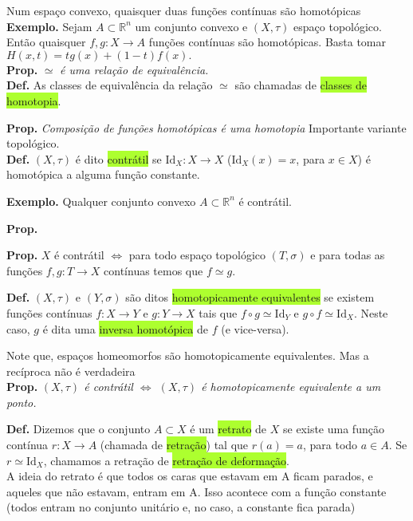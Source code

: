 \documentclass{article}
\begin{document}
\begin{landscape}
\begin{multicols}{3}
\color{blue!70} Num espaço convexo, quaisquer duas funções contínuas são homotópicas\color{black}\\
\textbf{Exemplo.} Sejam \( A \subset \mathbb{R}^n \) um conjunto convexo e \( (X, \tau) \) espaço topológico. Então quaisquer \( f, g : X \to A \) funções contínuas são homotópicas. Basta tomar 
$H(x,t) = t g(x) + (1 - t) f(x).$\\

\textbf{Prop.} \( \simeq \) \textit{é uma relação de equivalência.}\\

\textbf{Def.} As classes de equivalência da relação \( \simeq \) são chamadas de \colorbox{GreenYellow}{classes de homotopia}.

\textbf{Prop.} \textit{Composição de funções homotópicas é uma homotopia}\medskip
\color{blue!70}Importante variante topológico.\color{black}\\
\textbf{Def.} \( (X, \tau) \) é dito \colorbox{GreenYellow}{contrátil} se \( \mathrm{Id}_X : X \to X \) (\( \mathrm{Id}_X(x) = x \), para \( x \in X \)) é homotópica a alguma função constante.\medskip

\textbf{Exemplo.} Qualquer conjunto convexo \( A \subset \mathbb{R}^n \) é contrátil.\medskip

\textbf{Prop. } \medskip

\textbf{Prop. } $X$ é contrátil $\Leftrightarrow$ para todo espaço topológico $(T, \sigma)$ e para todas as funções $f,g:T\to X$ contínuas temos que $f\simeq g$.\medskip

\textbf{Def.} \( (X, \tau) \) e \( (Y, \sigma) \) são ditos \colorbox{GreenYellow}{homotopicamente equivalentes} se existem funções contínuas \( f : X \to Y \) e \( g : Y \to X \) tais que \( f \circ g \simeq \mathrm{Id}_Y \) e \( g \circ f \simeq \mathrm{Id}_X \). Neste caso, \( g \) é dita uma \colorbox{GreenYellow}{inversa homotópica} de \( f \) (e vice-versa).\medskip

\color{blue!70}Note que, espaços homeomorfos são homotopicamente equivalentes. Mas a recíproca não é verdadeira\color{black}\\
\textbf{Prop.} \textit{\( (X, \tau) \) é contrátil $\Leftrightarrow$ \( (X, \tau) \) é homotopicamente equivalente a um ponto.}\medskip


\textbf{Def.} Dizemos que o conjunto \( A \subset X \) é um \colorbox{GreenYellow}{retrato} de \( X \) se existe uma função contínua \( r : X \to A \) (chamada de \colorbox{GreenYellow}{retração}) tal que \( r(a) = a \), para todo \( a \in A \). Se \( r \simeq \mathrm{Id}_X \), chamamos a retração de \colorbox{GreenYellow}{retração de deformação}.\\
\color{gray}A ideia do retrato é que todos os caras que estavam em A ficam parados, e aqueles que não estavam, entram em A. Isso acontece com a função constante (todos entram no conjunto unitário e, no caso, a constante fica parada)\color{black}


\end{multicols}
\end{landscape}
\end{document}
